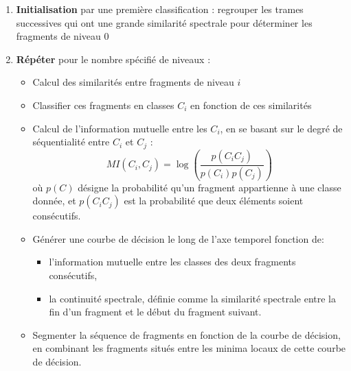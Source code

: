   \begin{enumerate}
  \item \textbf{Initialisation} par une première classification : regrouper les trames successives qui ont une grande similarité spectrale pour déterminer les fragments de niveau 0
  \item \textbf{Répéter} pour le nombre spécifié de niveaux :
    \begin{itemize}
    \item Calcul des similarités entre fragments de niveau $i$
    \item Classifier ces fragments en classes $C_i$ en fonction de ces similarités
    \item Calcul de l'information mutuelle entre les $C_i$, en se basant sur le degré de séquentialité entre $C_i$ et $C_j$ :
      \[ MI \left( C_i, C_j \right) = \log \left(\frac{p\left(C_iC_j\right)}{p\left(C_i\right)p\left(C_j\right)}\right) \]
      où $p(C)$ désigne la probabilité qu'un fragment appartienne à une classe donnée, et $p(C_iC_j)$ est la probabilité que deux éléments soient consécutifs.
    \item Générer une courbe de décision le long de l'axe temporel fonction de:
      \begin{itemize}
      \item l'information mutuelle entre les classes des deux fragments consécutifs,
      \item la continuité spectrale, définie comme la similarité spectrale entre la fin d'un fragment et le début du fragment suivant.
        \end{itemize}
    \item Segmenter la séquence de fragments en fonction de la courbe de décision, en combinant les fragments situés entre les minima locaux de cette courbe de décision.
    \end{itemize}
  \end{enumerate}


